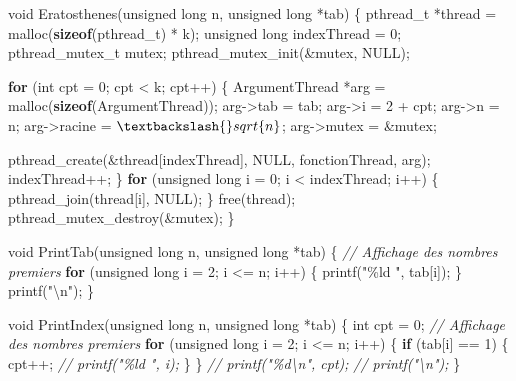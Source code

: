 \documentclass[
    ]{article}
\newenvironment{Shaded}{}{}
\newcommand{\CommentTok}[1]{\textcolor[rgb]{0.38,0.63,0.69}{\textit{#1}}}
\newcommand{\ControlFlowTok}[1]{\textcolor[rgb]{0.00,0.44,0.13}{\textbf{#1}}}
\newcommand{\DataTypeTok}[1]{\textcolor[rgb]{0.56,0.13,0.00}{#1}}
\newcommand{\DecValTok}[1]{\textcolor[rgb]{0.25,0.63,0.44}{#1}}
\newcommand{\KeywordTok}[1]{\textcolor[rgb]{0.00,0.44,0.13}{\textbf{#1}}}
\newcommand{\NormalTok}[1]{#1}
\newcommand{\SpecialCharTok}[1]{\textcolor[rgb]{0.25,0.44,0.63}{#1}}
\newcommand{\StringTok}[1]{\textcolor[rgb]{0.25,0.44,0.63}{#1}}
\begin{document}
\begin{Shaded}
    \begin{Highlighting}[]
\DataTypeTok{void}\NormalTok{ Eratosthenes(}\DataTypeTok{unsigned} \DataTypeTok{long}\NormalTok{ n, }\DataTypeTok{unsigned} \DataTypeTok{long}\NormalTok{ *tab)}
\NormalTok{\{}
\NormalTok{    pthread\_t *thread = malloc(}\KeywordTok{sizeof}\NormalTok{(pthread\_t) * k);}
    \DataTypeTok{unsigned} \DataTypeTok{long}\NormalTok{ indexThread = }\DecValTok{0}\NormalTok{;}
\NormalTok{    pthread\_mutex\_t mutex;}
\NormalTok{    pthread\_mutex\_init(\&mutex, NULL);}

    \ControlFlowTok{for}\NormalTok{ (}\DataTypeTok{int}\NormalTok{ cpt = }\DecValTok{0}\NormalTok{; cpt \textless{} k; cpt++)}
\NormalTok{    \{}
\NormalTok{        ArgumentThread *arg = malloc(}\KeywordTok{sizeof}\NormalTok{(ArgumentThread));}
\NormalTok{        arg{-}\textgreater{}tab = tab;}
\NormalTok{        arg{-}\textgreater{}i = }\DecValTok{2}\NormalTok{ + cpt;}
\NormalTok{        arg{-}\textgreater{}n = n;}
\NormalTok{        arg{-}\textgreater{}racine = $\textbackslash{}sqrt\{n\}$;}
\NormalTok{        arg{-}\textgreater{}mutex = \&mutex;}
        
\NormalTok{        pthread\_create(\&thread[indexThread], NULL, fonctionThread, arg);}
\NormalTok{        indexThread++;}
\NormalTok{    \}}
    \ControlFlowTok{for}\NormalTok{ (}\DataTypeTok{unsigned} \DataTypeTok{long}\NormalTok{ i = }\DecValTok{0}\NormalTok{; i \textless{} indexThread; i++)}
\NormalTok{    \{}
\NormalTok{        pthread\_join(thread[i], NULL);}
\NormalTok{    \}}
\NormalTok{    free(thread);}
\NormalTok{    pthread\_mutex\_destroy(\&mutex);}
\NormalTok{\}}

\DataTypeTok{void}\NormalTok{ PrintTab(}\DataTypeTok{unsigned} \DataTypeTok{long}\NormalTok{ n, }\DataTypeTok{unsigned} \DataTypeTok{long}\NormalTok{ *tab)}
\NormalTok{\{}
    \CommentTok{// Affichage des nombres premiers}
    \ControlFlowTok{for}\NormalTok{ (}\DataTypeTok{unsigned} \DataTypeTok{long}\NormalTok{ i = }\DecValTok{2}\NormalTok{; i \textless{}= n; i++)}
\NormalTok{    \{}
\NormalTok{        printf(}\StringTok{"\%ld "}\NormalTok{, tab[i]);}
\NormalTok{    \}}
\NormalTok{    printf(}\StringTok{"}\SpecialCharTok{\textbackslash{}n}\StringTok{"}\NormalTok{);}
\NormalTok{\}}

\DataTypeTok{void}\NormalTok{ PrintIndex(}\DataTypeTok{unsigned} \DataTypeTok{long}\NormalTok{ n, }\DataTypeTok{unsigned} \DataTypeTok{long}\NormalTok{ *tab)}
\NormalTok{\{}
    \DataTypeTok{int}\NormalTok{ cpt = }\DecValTok{0}\NormalTok{;}
    \CommentTok{// Affichage des nombres premiers}
    \ControlFlowTok{for}\NormalTok{ (}\DataTypeTok{unsigned} \DataTypeTok{long}\NormalTok{ i = }\DecValTok{2}\NormalTok{; i \textless{}= n; i++)}
\NormalTok{    \{}
        \ControlFlowTok{if}\NormalTok{ (tab[i] == }\DecValTok{1}\NormalTok{)}
\NormalTok{        \{}
\NormalTok{            cpt++;}
            \CommentTok{// printf("\%ld ", i);}
\NormalTok{        \}}
\NormalTok{    \}}
    \CommentTok{// printf("\%d\textbackslash{}n", cpt);}
    \CommentTok{// printf("\textbackslash{}n");}
\NormalTok{\}}


\end{Highlighting}
\end{Shaded}
\end{document}
